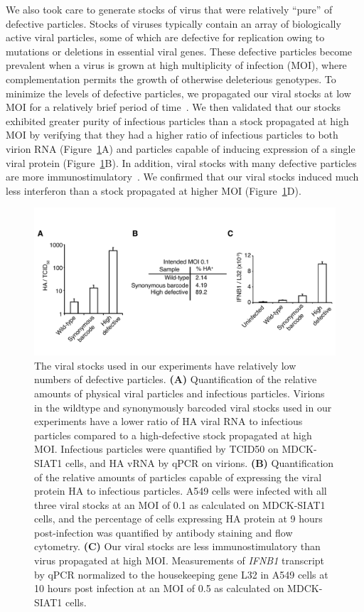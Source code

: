 \documentclass[9pt,lineno]{elife}
\begin{document}
We also took care to generate stocks of virus that were relatively ``pure'' of defective particles.
Stocks of viruses typically contain an array of biologically active viral particles, some of which are defective for replication owing to mutations or deletions in essential viral genes.
These defective particles become prevalent when a virus is grown at high multiplicity of infection (MOI), where complementation permits the growth of otherwise deleterious genotypes.
To minimize the levels of defective particles, we propagated our viral stocks at low MOI for a relatively brief period of time~\citep{xue2016propagation}.
We then validated that our stocks exhibited greater purity of infectious particles than a stock propagated at high MOI by verifying that they had a higher ratio of infectious particles to both virion RNA (Figure~\ref{fig:viruspopulations}A) and particles capable of inducing expression of a single viral protein (Figure~\ref{fig:viruspopulations}B).
In addition, viral stocks with many defective particles are more immunostimulatory~\citep{tapia2013defective}.
We confirmed that our viral stocks induced much less interferon than a stock propagated at higher MOI (Figure~\ref{fig:viruspopulations}D).

\begin{figure}
\includegraphics[width=0.7\linewidth]{figures/Validating_barcode_virus/validating_populations_D02.pdf}
\caption{\label{fig:viruspopulations} The viral stocks used in our experiments have relatively low numbers of defective particles. 
{\bf (A)}
Quantification of the relative amounts of physical viral particles and infectious particles.
Virions in the wildtype and synonymously barcoded viral stocks used in our experiments have a lower ratio of HA viral RNA to infectious particles compared to a high-defective stock propagated at high MOI.
Infectious particles were quantified by TCID50 on MDCK-SIAT1 cells, and HA vRNA by qPCR on virions. 
{\bf (B)} 
Quantification of the relative amounts of particles capable of expressing the viral protein HA to infectious particles.
A549 cells were infected with all three viral stocks at an MOI of 0.1 as calculated on MDCK-SIAT1 cells, and the percentage of cells expressing HA protein at 9 hours post-infection was quantified by antibody staining and flow cytometry.
{\bf (C)} 
Our viral stocks are less immunostimulatory than virus propagated at high MOI. 
Measurements of \textit{IFNB1} transcript by qPCR normalized to the housekeeping gene L32 in A549 cells at 10 hours post infection at an MOI of 0.5 as calculated on MDCK-SIAT1 cells.}
\end{figure}
\end{document}

